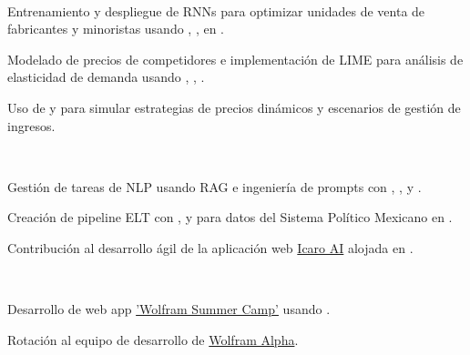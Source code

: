 \documentclass[]{tex/deedy-resume-openfont}
\begin{document}
\begin{minipage}[t]{0.66\textwidth}
\\
\begin{tightemize}
    \item Entrenamiento y despliegue de RNNs para optimizar unidades de venta de fabricantes y minoristas usando , ,  en .
    \item Modelado de precios de competidores e implementación de LIME para análisis de elasticidad de demanda usando , , .
    \item Uso de  y  para simular estrategias de precios dinámicos y escenarios de gestión de ingresos.
\end{tightemize}
\sectionsep

\\
\begin{tightemize}
    \item Gestión de tareas de NLP usando RAG e ingeniería de prompts con , ,  y .
    \item Creación de pipeline ELT con ,  y  para datos del Sistema Político Mexicano en .
    \item Contribución al desarrollo ágil de la aplicación web \href{http://www.icaro.ai/home/}{Icaro AI} alojada en .
\end{tightemize}
\sectionsep

\\
\begin{tightemize}
    \item Desarrollo de web app \href{https://education.wolfram.com/summer-camp/}{'Wolfram Summer Camp'} usando \href{https://www.wolfram.com/wolfram-one/}{}.
    \item Rotación al equipo de desarrollo de \href{https://www.wolframalpha.com/}{Wolfram Alpha}.
\end{tightemize}
\sectionsep



\end{minipage}
\end{document}
